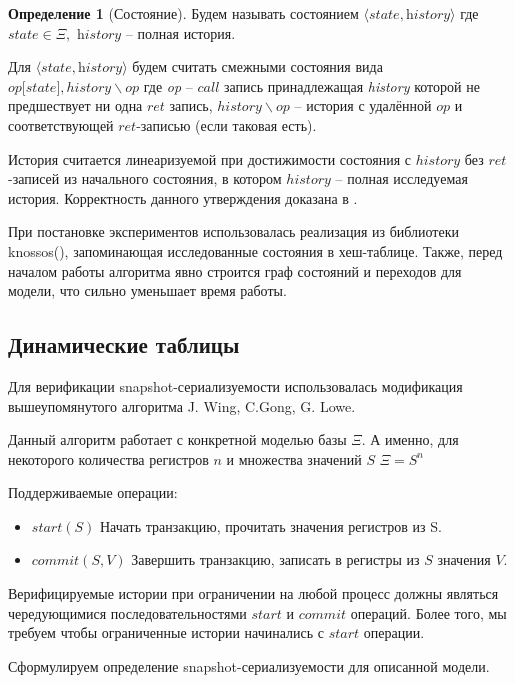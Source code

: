 \documentclass[pdftex,ptm,14pt,a4paper]{extreport}
\theoremstyle{definition}
\newtheorem{definition}{Определение}[chapter]
\begin{document}
\begin{definition}[Состояние]
    Будем называть состоянием $\langle \textit{state}, \textit{history} \rangle$ где
    $\textit{state} \in \Xi,$ $\textit{history}$ -- полная история.
\end{definition}

Для $\langle \textit{state}, \textit{history} \rangle$ будем считать смежными
состояния вида $op\lbrack state\rbrack, history \backslash op$ где
\textit{op} -- $call$ запись принадлежащая \textit{history} которой не предшествует ни одна
$ret$ запись, $history \backslash op$ -- история с удалённой $op$ и соответствующей $ret$-записью
(если таковая есть).

История считается линеаризуемой при достижимости состояния с $history$ без $ret$-записей из начального
состояния, в котором $history$ -- полная исследуемая история. Корректность данного утверждения
доказана в \cite{wing-testing}.

При постановке экспериментов использовалась реализация из библиотеки knossos(\cite{knossos}),
запоминающая исследованные состояния в хеш-таблице. Также, перед началом работы алгоритма явно строится
граф состояний и переходов для модели, что сильно уменьшает время работы.

\subsection{Динамические таблицы}
\label{dt-verify}
Для верификации snapshot-сериализуемости использовалась модификация вышеупомянутого алгоритма
J. Wing, C.Gong, G. Lowe.

Данный алгоритм работает с конкретной моделью базы $\Xi.$
А именно, для некоторого количества регистров $n$ и множества значений $S$
$\Xi = S^n$

Поддерживаемые операции:
\begin{itemize}
    \item{$start(S)$} Начать транзакцию, прочитать значения регистров из S.
    \item{$commit(S, V)$} Завершить транзакцию, записать в регистры из $S$ значения $V$.
\end{itemize}

Верифицируемые истории при ограничении на любой процесс должны являться чередующимися последовательностями
$start$ и $commit$ операций. Более того, мы требуем чтобы ограниченные истории начинались с $start$ операции.

Сформулируем определение snapshot-сериализуемости для описанной модели.
\end{document}
